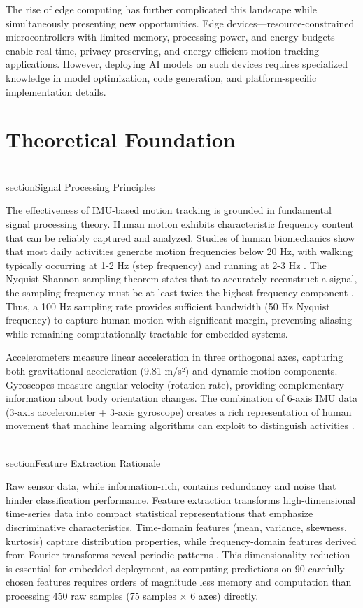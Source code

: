 The rise of edge computing has further complicated this landscape while simultaneously presenting new opportunities. Edge devices—resource-constrained microcontrollers with limited memory, processing power, and energy budgets—enable real-time, privacy-preserving, and energy-efficient motion tracking applications. However, deploying AI models on such devices requires specialized knowledge in model optimization, code generation, and platform-specific implementation details.

\section{Theoretical Foundation}

\\section{Signal Processing Principles}

The effectiveness of IMU-based motion tracking is grounded in fundamental signal processing theory. Human motion exhibits characteristic frequency content that can be reliably captured and analyzed. Studies of human biomechanics show that most daily activities generate motion frequencies below 20 Hz, with walking typically occurring at 1-2 Hz (step frequency) and running at 2-3 Hz \cite{whittle2014gait}. The Nyquist-Shannon sampling theorem states that to accurately reconstruct a signal, the sampling frequency must be at least twice the highest frequency component \cite{oppenheim1999discrete}. Thus, a 100 Hz sampling rate provides sufficient bandwidth (50 Hz Nyquist frequency) to capture human motion with significant margin, preventing aliasing while remaining computationally tractable for embedded systems.

Accelerometers measure linear acceleration in three orthogonal axes, capturing both gravitational acceleration (9.81 m/s²) and dynamic motion components. Gyroscopes measure angular velocity (rotation rate), providing complementary information about body orientation changes. The combination of 6-axis IMU data (3-axis accelerometer + 3-axis gyroscope) creates a rich representation of human movement that machine learning algorithms can exploit to distinguish activities \cite{filippeschi2017survey_imu}.

\\section{Feature Extraction Rationale}

Raw sensor data, while information-rich, contains redundancy and noise that hinder classification performance. Feature extraction transforms high-dimensional time-series data into compact statistical representations that emphasize discriminative characteristics. Time-domain features (mean, variance, skewness, kurtosis) capture distribution properties, while frequency-domain features derived from Fourier transforms reveal periodic patterns \cite{oppenheim1999discrete}. This dimensionality reduction is essential for embedded deployment, as computing predictions on 90 carefully chosen features requires orders of magnitude less memory and computation than processing 450 raw samples (75 samples × 6 axes) directly.

